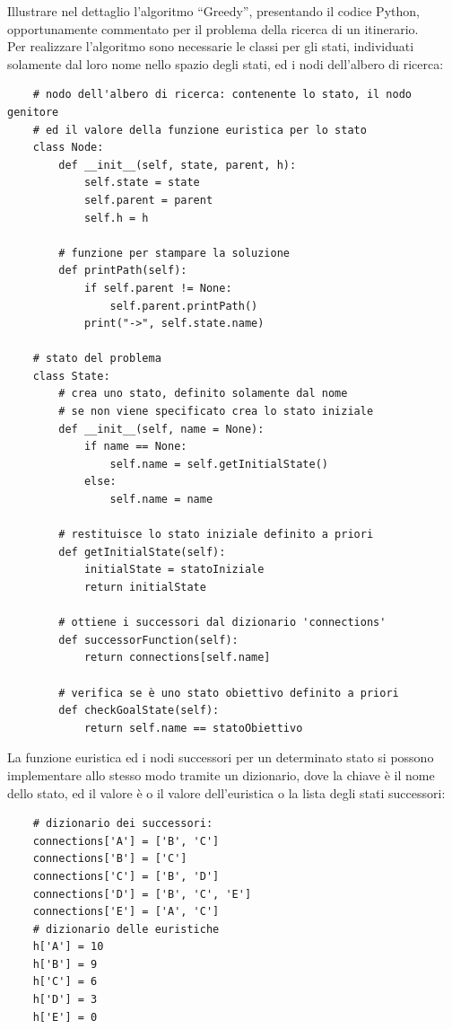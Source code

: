 \documentclass{article}
\numberwithin{equation}{section}
\begin{document}
Illustrare nel dettaglio l'algoritmo ``Greedy'', presentando il codice Python, opportunamente commentato per il problema della ricerca di un 
itinerario. \\
Per realizzare l'algoritmo sono necessarie le classi per gli stati, individuati solamente dal loro nome nello spazio degli stati, 
ed i nodi dell'albero di ricerca:
\begin{verbatim}
    # nodo dell'albero di ricerca: contenente lo stato, il nodo genitore
    # ed il valore della funzione euristica per lo stato
    class Node:
        def __init__(self, state, parent, h):
            self.state = state
            self.parent = parent
            self.h = h
        
        # funzione per stampare la soluzione
        def printPath(self):
            if self.parent != None:
                self.parent.printPath()
            print("->", self.state.name)
    
    # stato del problema
    class State:
        # crea uno stato, definito solamente dal nome
        # se non viene specificato crea lo stato iniziale
        def __init__(self, name = None):
            if name == None:
                self.name = self.getInitialState()
            else:
                self.name = name

        # restituisce lo stato iniziale definito a priori
        def getInitialState(self):
            initialState = statoIniziale
            return initialState

        # ottiene i successori dal dizionario 'connections'
        def successorFunction(self):
            return connections[self.name]

        # verifica se è uno stato obiettivo definito a priori
        def checkGoalState(self):
            return self.name == statoObiettivo
\end{verbatim}
La funzione euristica ed i nodi successori per un determinato stato si possono implementare 
allo stesso modo tramite un dizionario, dove la chiave è il nome dello stato, ed il valore 
è o il valore dell'euristica o la lista degli stati successori:
\begin{verbatim}
    # dizionario dei successori: 
    connections['A'] = ['B', 'C']
    connections['B'] = ['C']
    connections['C'] = ['B', 'D']
    connections['D'] = ['B', 'C', 'E']
    connections['E'] = ['A', 'C']
    # dizionario delle euristiche
    h['A'] = 10
    h['B'] = 9
    h['C'] = 6
    h['D'] = 3
    h['E'] = 0
\end{verbatim}
\end{document}

